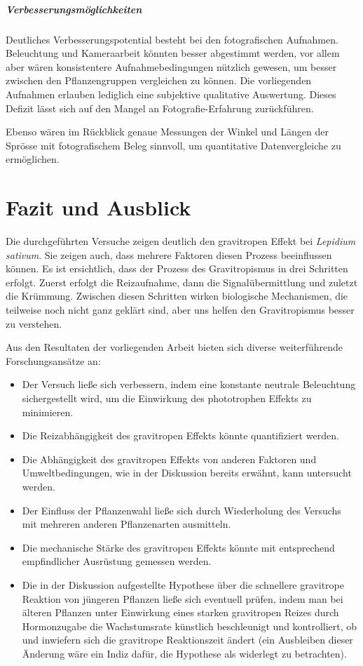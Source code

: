 \documentclass[
11pt, 
ngerman,
listof=totocnumbered,
oneside,
bibliography=totocnumbered,
abstracton
]{scrreprt}
\begin{document}
\paragraph{Verbesserungsmöglichkeiten}

Deutliches Verbesserungspotential besteht bei den fotografischen Aufnahmen. Beleuchtung und Kameraarbeit könnten besser abgestimmt werden, vor allem aber wären konsistentere Aufnahmebedingungen nützlich gewesen, um besser zwischen den Pflanzengruppen vergleichen zu können. Die vorliegenden Aufnahmen erlauben lediglich eine subjektive qualitative Auswertung. Dieses Defizit lässt sich auf den Mangel an Fotografie-Erfahrung zurückführen. 

Ebenso wären im Rückblick genaue Messungen der Winkel und Längen der Sprösse mit fotografischem Beleg sinnvoll, um quantitative Datenvergleiche zu ermöglichen. 

\chapter{Fazit und Ausblick}

Die durchgeführten Versuche zeigen deutlich den gravitropen Effekt bei \emph{Lepidium sativum}. Sie zeigen auch, dass mehrere Faktoren diesen Prozess beeinflussen können. Es ist ersichtlich, dass der Prozess des Gravitropismus in drei Schritten erfolgt. Zuerst erfolgt die Reizaufnahme, dann die Signalübermittlung und zuletzt die Krümmung. Zwischen diesen Schritten wirken biologische Mechanismen, die teilweise noch nicht ganz geklärt sind, aber uns helfen den Gravitropismus besser zu verstehen. 

Aus den Resultaten der vorliegenden Arbeit bieten sich diverse weiterführende Forschungsansätze an: 

\begin{itemize}
	\item Der Versuch ließe sich verbessern, indem eine konstante neutrale Beleuchtung sichergestellt wird, um die Einwirkung des phototrophen Effekts zu minimieren. 
	\item Die Reizabhängigkeit des gravitropen Effekts könnte quantifiziert werden. 
	\item Die Abhängigkeit des gravitropen Effekts von anderen Faktoren und Umweltbedingungen, wie in der Diskussion bereits erwähnt, kann untersucht werden. 
	\item Der Einfluss der Pflanzenwahl ließe sich durch Wiederholung des Versuchs mit mehreren anderen Pflanzenarten ausmitteln. 
	\item Die mechanische Stärke des gravitropen Effekts könnte mit entsprechend empfindlicher Ausrüstung gemessen werden. 
	\item Die in der Diskussion aufgestellte Hypothese über die schnellere gravitrope Reaktion von jüngeren Pflanzen ließe sich eventuell prüfen, indem man bei älteren Pflanzen unter Einwirkung eines starken gravitropen Reizes durch Hormonzugabe die Wachstumsrate künstlich beschleunigt und kontrolliert, ob und inwiefern sich die gravitrope Reaktionszeit ändert (ein Ausbleiben dieser Änderung wäre ein Indiz dafür, die Hypothese als widerlegt zu betrachten). 
\end{itemize}
\end{document}
